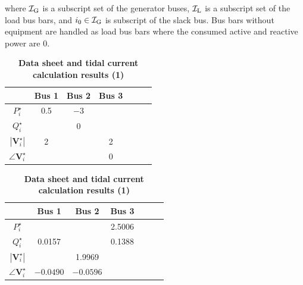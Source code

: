\documentclass[tombow,dvipdfmx]{corona-a5-1.1}
\begin{document}
where $\mathcal{I}_{\rm G}$ is a subscript set of the generator buses, $\mathcal{I}_{\rm L}$ is a subscript set of the load bus bars, and $i_0 \in \mathcal{I}_{\rm G}$ is subscript of the slack bus.
Bus bars without equipment are handled as load bus bars where the consumed active and reactive power are 0. 

%


\begin{table}[h]
\medskip
\caption{\textbf{Data sheet and tidal current calculation results (1)}} \label{table:pflow1}
 \centering
  {
  \begin{minipage}{0.49\linewidth}
    \centering
  \begin{tabular}{|c|c|c|c|c|c|c|}
   \hline
 & Bus 1 & Bus 2 & Bus 3 \\
   \hline 
   $P_i^{\star}$ & 0.5 & $-3$ & \\
   \hline
   $Q_i^{\star}$ &  & 0 & \\
   \hline
   $|\bm{V}_i^{\star}|$ & 2 & & 2 \\
   \hline
   $\angle \bm{V}_i^{\star}$ & & & 0 \\
   \hline
  \end{tabular}
  \end{minipage}
  \begin{minipage}{0.49\linewidth}
    \centering
  \begin{tabular}{|c|c|c|c|c|c|c|}
   \hline
 & Bus 1 & Bus 2 & Bus 3 \\
   \hline 
   $P_i^{\star}$ & & & 2.5006 \\
   \hline
   $Q_i^{\star}$ & 0.0157 & & 0.1388 \\
   \hline
   $|\bm{V}_i^{\star}|$ & & 1.9969 & \\
   \hline
   $\angle \bm{V}_i^{\star}$ & $-0.0490$ & $-0.0596$ & \\
   \hline
  \end{tabular}
  \end{minipage}
  }
\end{table}
\end{document}

